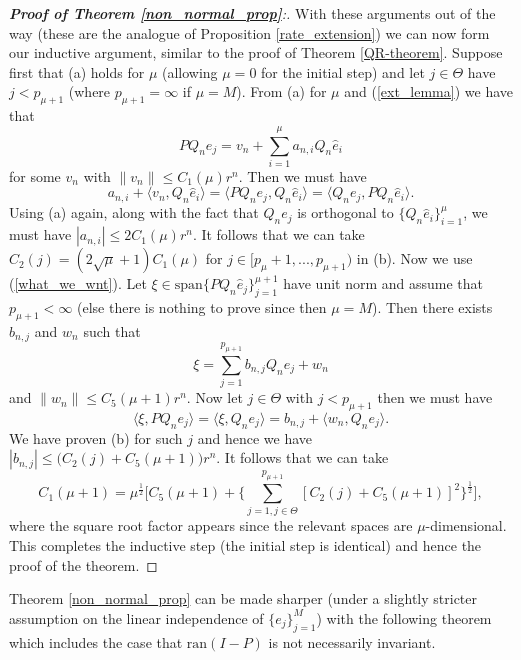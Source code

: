 \documentclass[a4paper,10pt]{article}
\begin{document}
\begin{proof}[\textbf{Proof of Theorem \ref{non_normal_prop}}:]
With these arguments out of the way (these are the analogue of Proposition \ref{rate_extension}) we can now form our inductive argument, similar to the proof of Theorem \ref{QR-theorem}. Suppose first that (a) holds for $\mu$ (allowing $\mu=0$ for the initial step) and let $j\in\Theta$ have $j<p_{\mu+1}$ (where $p_{\mu+1}=\infty$ if $\mu=M$). From (a) for $\mu$ and (\ref{ext_lemma}) we have that
$$
PQ_ne_j=v_{n}+\sum_{i=1}^\mu a_{n,i}Q_n\hat e_i
$$
for some $v_{n}$ with $\|v_{n}\|\leq C_1(\mu)r^n$. Then we must have
$$
a_{n,i}+\langle v_{n}, Q_n\hat e_i\rangle = \langle PQ_n e_j,Q_n \hat e_i\rangle=\langle Q_n e_j,PQ_n \hat e_i\rangle.
$$
Using (a) again, along with the fact that $Q_n e_j$ is orthogonal to $\{Q_n\hat e_i\}_{i=1}^\mu$, we must have $\left|a_{n,i}\right|\leq 2C_1(\mu)r^n$. It follows that we can take $C_2(j)=(2\sqrt{\mu}+1)C_1(\mu)$ for $j\in[p_{\mu}+1,...,p_{\mu+1})$ in (b). Now we use (\ref{what_we_wnt}). Let $\xi\in\mathrm{span}\{PQ_n\hat e_j\}_{j=1}^{\mu+1}$ have unit norm and assume that $p_{\mu+1}<\infty$ (else there is nothing to prove since then $\mu=M$). Then there exists $b_{n,j}$ and $w_n$ such that
$$
\xi = \sum_{j=1}^{p_{\mu+1}} b_{n,j}Q_n e_j +w_n
$$
and $\|w_n\|\leq C_5(\mu+1)r^n$. Now let $j\in\Theta$ with $j<p_{\mu+1}$ then we must have
$$
\langle \xi, PQ_ne_j\rangle=\langle \xi, Q_ne_j\rangle=b_{n,j}+\langle w_n,Q_ne_j\rangle.
$$
We have proven (b) for such $j$ and hence we have $\left|b_{n,j}\right|\leq \big(C_2(j)+C_5(\mu+1)\big)r^n$. It follows that we can take
$$
C_1(\mu+1)=\mu^{\frac{1}{2}}\Big[C_5(\mu+1)+\Big\{\sum_{j=1,j\in\Theta}^{p_{\mu+1}}[C_2(j)+C_5(\mu+1)]^2\Big\}^{\frac{1}{2}}\Big],
$$
where the square root factor appears since the relevant spaces are $\mu$-dimensional. This completes the inductive step (the initial step is identical) and hence the proof of the theorem.
\end{proof}

Theorem \ref{non_normal_prop} can be made sharper (under a slightly stricter assumption on the linear independence of $\{e_j\}_{j=1}^M$) with the following theorem which includes the case that $\mathrm{ran}(I-P)$ is not necessarily invariant.
\end{document}
